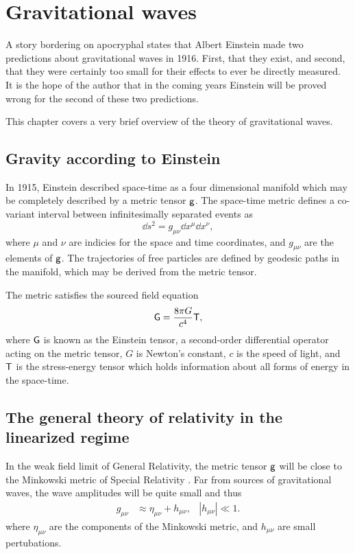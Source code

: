 \chapter{Gravitational waves}
\label{ch:gws}
A story bordering on apocryphal states that Albert Einstein made two predictions about gravitational waves in 1916. %
First, that they exist, and second, that they were certainly too small for their effects to ever be directly measured. %
It is the hope of the author that in the coming years Einstein will be proved wrong for the second of these two predictions.

This chapter covers a very brief overview of the theory of gravitational waves. %


\section{Gravity according to Einstein}
In 1915, Einstein described space-time as a four dimensional manifold which may be completely described by a metric tensor $\mathsf{g}$. %
The space-time metric defines a co-variant interval between infinitesimally separated events as
\begin{equation}
\dd s^2 = g_{\mu \nu}\dd x^\mu \dd x^\nu,
\end{equation}
where $\mu$ and $\nu$ are indicies for the space and time coordinates, and $g_{\mu \nu}$ are the elements of $\mathsf{g}$. %
The trajectories of free particles are defined by geodesic paths in the manifold, which may be derived from the metric tensor\cite[Chap. %
3]{carroll2004spacetime}.

The metric satisfies the sourced field equation
\begin{equation}
\label{eqn:einstein}
\mathsf{G}=\frac{8\pi G}{c^4}\mathsf{T},
\end{equation}
where $\mathsf{G}$ is known as the Einstein tensor, a second-order differential operator acting on the metric tensor, $G$ is Newton's constant, $c$ is the speed of light, and $\mathsf{T}$ is the stress-energy tensor which holds information about all forms of energy in the space-time.

\section{The general theory of relativity in the linearized regime}
In the weak field limit of General Relativity, the metric tensor $\mathsf{g}$ will be close to the Minkowski metric of Special Relativity \cite[Chap. %
7]{carroll2004spacetime}. %
Far from sources of gravitational waves, the wave amplitudes will be quite small and thus
\begin{align}
g_{\mu \nu}&\approx \eta_{\mu \nu}+h_{\mu \nu}, &|h_{\mu \nu}|\ll 1.
\end{align}
where $\eta_{\mu \nu}$ are the components of the Minkowski metric, and $h_{\mu \nu}$ are small pertubations.

